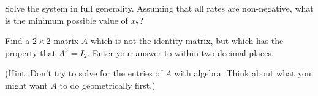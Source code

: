 \begin{center}

\end{center}


Solve the system in full generality.  Assuming that all rates are non-negative, what is the minimum possible value of $x_7$?  


\edXsolution{
}

\endedxproblem


\endedxvertical




Find a $2\times 2$ matrix $A$ which is not the identity matrix, but which has the property
that $A^3 = I_2$.  Enter your answer to within two decimal places.  

(Hint: Don't try to solve for the entries of $A$ with algebra.  Think about what you might want $A$ to do geometrically first.)




\edXsolution{

}


\endedxproblem







\endedxvertical






